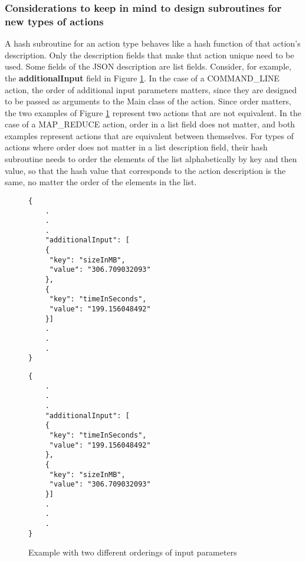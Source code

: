 \subsubsection{Considerations to keep in mind to design subroutines for new types of actions}
A hash subroutine for an action type behaves like a hash function of that action's description.  Only the description fields that make that action unique need to be used.  Some fields of the JSON description are list fields.  Consider, for example, the \textbf{additionalInput} field in Figure \ref{fig:action_parameters_ordering}.  In the case of a COMMAND\_LINE action, the order of additional input parameters matters, since they are designed to be passed as arguments to the Main class of the action.  Since order matters, the two examples of Figure \ref{fig:action_parameters_ordering} represent two actions that are not equivalent. In the case of a MAP\_REDUCE action, order in a list field does not matter, and both examples represent actions that are equivalent between themselves. For types of actions where order does not matter in a list description field, their hash subroutine needs to order the elements of the list alphabetically by key and then value, so that the hash value that corresponds to the action description is the same, no matter the order of the elements in the list.

\begin{figure}[htbp]
\centering
\begin{singlespace}
\begin{minipage}[b]{7 cm}
\begin{mdframed}
\begin{verbatim}
{
    .
    .
    .
    "additionalInput": [
    {
     "key": "sizeInMB",
     "value": "306.709032093"
    }, 
    {
     "key": "timeInSeconds", 
     "value": "199.156048492"
    }]
    .
    .
    .
}
\end{verbatim}
\end{mdframed}
\end{minipage}
\begin{minipage}[b]{7 cm}
\begin{mdframed}
\begin{verbatim}
{
    .
    .
    .
    "additionalInput": [
    {
     "key": "timeInSeconds", 
     "value": "199.156048492"
    },
    {
     "key": "sizeInMB",
     "value": "306.709032093"
    }]
    .
    .
    .
}
\end{verbatim}
\end{mdframed}
\end{minipage}
\end{singlespace}
\caption{Example with two different orderings of input parameters}
\label{fig:action_parameters_ordering}
\end{figure}



